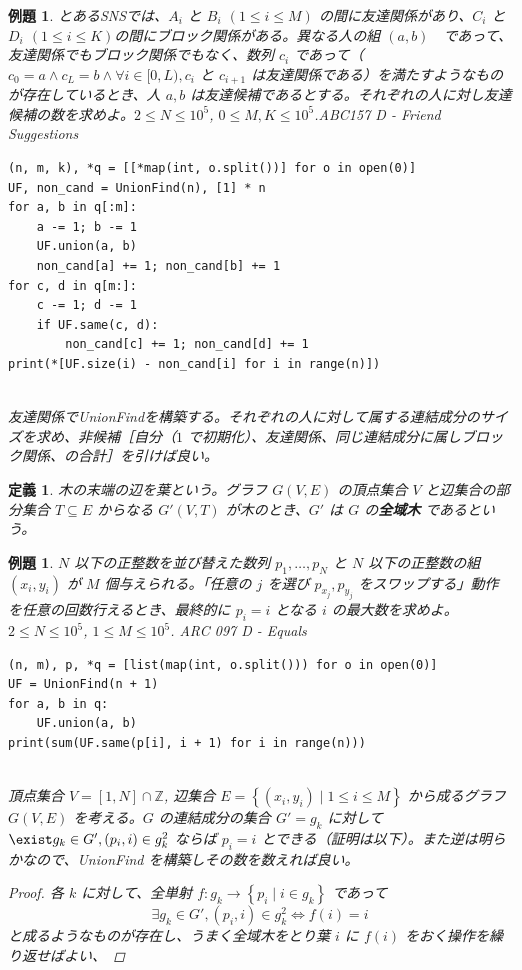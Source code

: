 \documentclass[12pt, a4j]{ltjsarticle}
\newtheorem{defi}[thm]{定義}
\newtheorem{exm}[thm]{例題}
\newcommand*{\ZZ}{\mathbb{Z}}
\newcommand*{\SS}{\vspace{1cm}}
\begin{document}
\SS

\begin{exm}\upshape
とあるSNSでは、$A_i$ と $B_i$ $(1\le i\le M)$ の間に友達関係があり、$C_i$ と $D_i$ $(1\le i\le K)$の間にブロック関係がある。異なる人の組 $(a,b)$　であって、友達関係でもブロック関係でもなく、数列 $c_i$ であって（ $c_0 = a \land c_L = b \land \forall i \in [0,L), c_i$ と $c_{i+1}$ は友達関係である）を満たすようなものが存在しているとき、人 $a,b$ は友達候補であるとする。それぞれの人に対し友達候補の数を求めよ。$2\le N\le 10^5$, $0\le M,K\le 10^5$.\quad ABC157 D - Friend Suggestions\\
\begin{lstlisting}[frame = none]
(n, m, k), *q = [[*map(int, o.split())] for o in open(0)]
UF, non_cand = UnionFind(n), [1] * n
for a, b in q[:m]:
    a -= 1; b -= 1
    UF.union(a, b)
    non_cand[a] += 1; non_cand[b] += 1
for c, d in q[m:]:
    c -= 1; d -= 1
    if UF.same(c, d):
        non_cand[c] += 1; non_cand[d] += 1
print(*[UF.size(i) - non_cand[i] for i in range(n)])
\end{lstlisting}\quad\\
友達関係でUnionFindを構築する。それぞれの人に対して属する連結成分のサイズを求め、非候補［自分（$1$ で初期化）、友達関係、同じ連結成分に属しブロック関係、の合計］を引けば良い。
\end{exm}

\newpage

\begin{defi} 木の末端の辺を葉という。グラフ $G(V,E)$ の頂点集合 $V$ と辺集合の部分集合 $T\subseteq E$ からなる $G'(V,T)$ が木のとき、$G'$ は $G$ の{\bf 全域木} であるという。
\end{defi}

\SS

\begin{exm} $N$ 以下の正整数を並び替えた数列 $p_1,\ldots,p_N$ と $N$ 以下の正整数の組 $(x_i,y_i)$ が $M$ 個与えられる。「任意の $j$ を選び $p_{x_j},p_{y_j}$ をスワップする」動作を任意の回数行えるとき、最終的に $p_i=i$ となる $i$ の最大数を求めよ。 $2\le N\le 10^5$, $1\le M\le 10^5$. \quad\upshape ARC 097 D - Equals\\
\begin{lstlisting}
(n, m), p, *q = [list(map(int, o.split())) for o in open(0)]
UF = UnionFind(n + 1)
for a, b in q:
    UF.union(a, b)
print(sum(UF.same(p[i], i + 1) for i in range(n)))
\end{lstlisting}\quad\\
頂点集合 $V=[1,N]\cap\ZZ$, 辺集合 $E=\left\{(x_i,y_i)\mid1\le i\le M\right\}$ から成るグラフ $G(V,E)$ を考える。$G$ の連結成分の集合 $G'={g_k}$ に対して $\exist g_k\in G', (p_i,i) \in g_k^2$ ならば $p_i=i$ とできる（証明は以下）。また逆は明らかなので、UnionFind を構築しその数を数えれば良い。
\begin{proof}
各 $k$ に対して、全単射 $f:g_k \rightarrow \left\{p_i\mid i \in g_k \right\}$ であって
\begin{equation}
\exists g_k\in G', (p_i,i) \in g_k^2 \Longleftrightarrow f(i)=i
\end{equation}
と成るようなものが存在し、うまく全域木をとり葉 $i$ に $f(i)$ をおく操作を繰り返せばよい、
\end{proof}
\end{exm}
\end{document}
